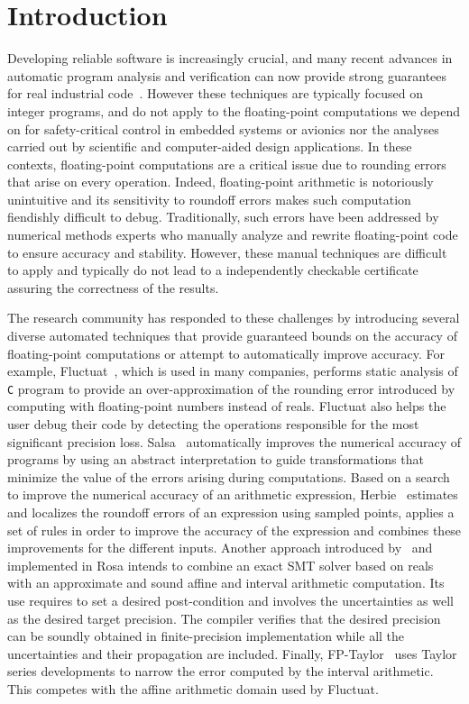 \documentclass[main.tex]{subfiles}
\begin{document}
\section{Introduction}
\label{sec:intro}

Developing reliable software is increasingly crucial, and many recent
advances in automatic program analysis and verification can now provide
strong guarantees for real industrial code~.  However these
techniques are typically focused on integer programs, and do not apply to
the floating-point computations we depend on for safety-critical control in
embedded systems or avionics nor the analyses carried out by scientific and
computer-aided design applications.  In these contexts, floating-point
computations are a critical issue due to rounding errors that arise on
every operation.  Indeed, floating-point arithmetic is notoriously
unintuitive and its sensitivity to roundoff errors makes such computation
fiendishly difficult to debug.  Traditionally, such errors have been
addressed by numerical methods experts who manually analyze and rewrite
floating-point code to ensure accuracy and stability.  However, these
manual techniques are difficult to apply and typically do not lead to a
independently checkable certificate assuring the correctness of the
results.

The research community has responded to these challenges by introducing
several diverse automated techniques that provide guaranteed bounds on the
accuracy of floating-point computations or attempt to automatically improve
accuracy.  For example, Fluctuat~\cite{Goubault13,GMP06}, which is used in
many companies, performs static analysis of \texttt{C} program to provide
an over-approximation of the rounding error introduced by computing with
floating-point numbers instead of reals.  Fluctuat also helps the user
debug their code by detecting the operations responsible for the most
significant precision loss.  Salsa~\cite{fmics15} automatically improves
the numerical accuracy of programs by using an abstract interpretation to
guide transformations that minimize the value of the errors arising during
computations.  Based on a search to improve the numerical accuracy of an
arithmetic expression, Herbie~\cite{pavel15} estimates and localizes the
roundoff errors of an expression using sampled points, applies a set of
rules in order to improve the accuracy of the expression and combines these
improvements for the different inputs.  Another approach introduced
by~\cite{DarulovaK14} and implemented in Rosa intends to combine an exact
SMT solver based on reals with an approximate and sound affine and interval
arithmetic computation.  Its use requires to set a desired post-condition
and involves the uncertainties as well as the desired target precision.
The compiler verifies that the desired precision can be soundly obtained in
finite-precision implementation while all the uncertainties and their
propagation are included.  Finally, FP-Taylor~\cite{fptaylor-fm15} uses
Taylor series developments to narrow the error computed by the interval
arithmetic.  This competes with the affine arithmetic domain used by
Fluctuat.
\end{document}
